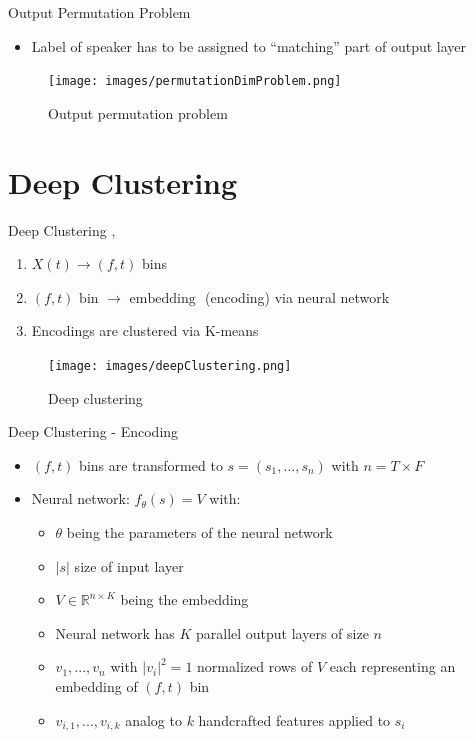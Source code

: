 \documentclass[xcolor=table,mathserif,9pt]{beamer}    %
\begin{document}
\begin{frame}{Output Permutation Problem \cite{SingleChannelSourceSeparation}}
	\begin{itemize}
		\item Label of speaker has to be assigned to ``matching'' part of output layer
	\end{itemize}

	\begin{figure}[htpb]
		\centering
		\texttt{[image: images/permutationDimProblem.png]}
		\caption{Output permutation problem}
	\end{figure}

\end{frame}

\section{Deep Clustering}%
\label{sec:deep_clustering}
\begin{frame}{Deep Clustering \cite{SingleChannelSourceSeparation}, \cite{BasicDeepClustering:2016}}

\begin{enumerate}
	\item $X(t) \to (f,t)$ bins
	\item $(f,t) \text{ bin } \to \text{ embedding }$ (encoding) via neural network
	\item Encodings are clustered via K-means
\end{enumerate}

\begin{figure}[htpb]
	\centering
	\texttt{[image: images/deepClustering.png]}
	\caption{Deep clustering}
\end{figure}

\end{frame}

\begin{frame}{Deep Clustering - Encoding}

 \begin{itemize}
	 \item $(f,t)$ bins are transformed to 
		 $s = (s_1, ..., s_n)$  with $n = T \times F$
	 \item Neural network: \emph{$f_{\theta}(s) = V$} with: 
		\begin{itemize}
			\item $\theta$ being the parameters of the neural network
			\item $|s|$ size of input layer
			\item $V \in \mathbb{R}^{n \times K}$ being the embedding
			\item Neural network has $K$ parallel output layers of size $n$
		        \item $v_1, ..., v_n$ with \emph{$|v_i|^2 = 1$} normalized rows of $V$
			      each representing an embedding of $(f,t)$ bin 
			\item $v_{i,1}, ..., v_{i,k}$ analog to $k$ handcrafted 
			      features applied to $s_i$
		\end{itemize}
 \end{itemize}
\end{frame}
\end{document}

